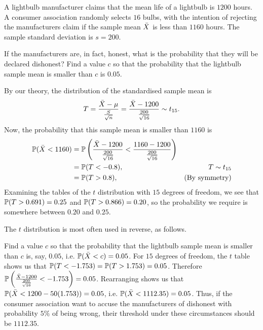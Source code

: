 \documentclass[10pt, a4paper]{article}
\begin{document}
\begin{example}
    A lightbulb manufacturer claims that the mean life of a lightbulb is $1200$ hours.
    A consumer association randomly selects $16$ bulbs,
    with the intention of rejecting the manufacturers claim if the sample mean $\Bar{X}$ is less than $1160$ hours.
    The sample standard deviation is $s = 200$.

    If the manufacturers are,
    in fact,
    honest,
    what is the probability that they will be declared dishonest?
    Find a value $c$ so that the probability that the lightbulb sample mean is smaller than $c$ is $0.05$.

    \begin{solution}
        By our theory,
        the distribution of the standardised sample mean is
        \[
        T = \frac{\Bar{X} - \mu}{\frac{S}{\sqrt{n}}} = \frac{\Bar{X} - 1200}{\frac{200}{\sqrt{16}}} \sim t_{15}.
        \]
        Now,
        the probability that this sample mean is smaller than $1160$ is
        \begin{align*}
            \P(\Bar{X} < 1160) &= \P\left(\frac{\Bar{X} - 1200}{\frac{200}{\sqrt{16}}} < \frac{1160 - 1200}{\frac{200}{\sqrt{16}}}\right) \\
            &= \P(T < -0.8), & T \sim t_{15} \\
            &= \P(T > 0.8), &(\text{By symmetry})
        \end{align*}
        Examining the tables of the $t$ distribution with $15$ degrees of freedom,
        we see that $\P(T > 0.691) = 0.25$ and $\P(T > 0.866) = 0.20$,
        so the probability we require is somewhere between $0.20$ and $0.25$.

        The $t$ distribution is most often used in reverse,
        as follows.

        Find a value $c$ so that the probability that the lightbulb sample mean is smaller than $c$ is,
        say,
        $0.05$,
        i.e. $\P(\Bar{X} < c) = 0.05$.
        For $15$ degrees of freedom,
        the $t$ table shows us that $\P(T < -1.753) = \P(T > 1.753) = 0.05$.
        Therefore $\P\left(\frac{\Bar{X} - 1200}{\frac{200}{\sqrt{16}}} < -1.753\right) = 0.05$.
        Rearranging shows us that $\P(\Bar{X} < 1200 - 50(1.753)) = 0.05$,
        i.e. $\P(\Bar{X} < 1112.35) = 0.05$.
        Thus,
        if the consumer association want to accuse the manufacturers of dishonest with probability $5\%$ of being wrong,
        their threshold under these circumstances should be $1112.35$.
    \end{solution}
\end{example}
\end{document}
